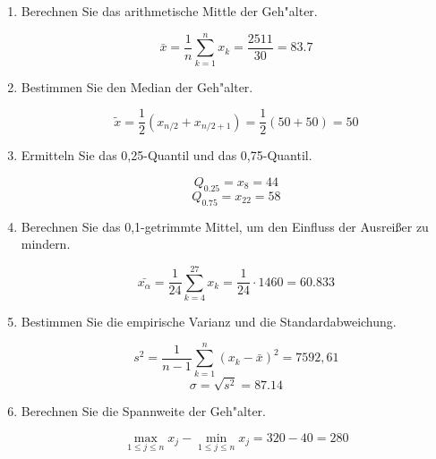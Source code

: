\documentclass[10pt, a4paper, oneside]{article}
\begin{document}
\begin{enumerate}[1.]
    \item Berechnen Sie das arithmetische Mittle der Geh"alter.
        
        $$\bar{x} = \dfrac{1}{n}\sum_{k=1}^nx_k = \dfrac{2511}{30} = 83.7$$

    \item Bestimmen Sie den Median der Geh"alter.

        $$\widetilde{x} = \dfrac{1}{2}(x_{n/2} + x_{n/2 + 1}) = \dfrac{1}{2}(50 + 50) = 50$$

    \item Ermitteln Sie das 0,25-Quantil und das 0,75-Quantil.

        $$Q_{0.25} = x_8 = 44$$
        $$Q_{0.75} = x_{22} = 58$$

    \item Berechnen Sie das 0,1-getrimmte Mittel, um den Einfluss der Ausreißer
        zu mindern.

        $$\bar{x_{\alpha}} = \dfrac{1}{24}\sum_{k = 4}^{27}x_k = \dfrac{1}{24} \cdot 1460 = 60.833$$

    \item Bestimmen Sie die empirische Varianz und die Standardabweichung.

        $$s^2 = \dfrac{1}{n - 1}\sum_{k=1}^n(x_k - \bar{x})^2 = 7592,61$$
        $$\sigma = \sqrt{s^2} = 87.14$$

    \item Berechnen Sie die Spannweite der Geh"alter.

        $$\max_{1 \leq j \leq n}x_j - \min_{1 \leq j \leq n}x_j = 320 - 40 = 280$$

\end{enumerate}
\end{document}
